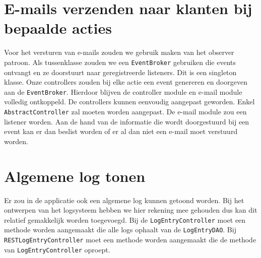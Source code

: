 \documentclass{article}
\begin{document}
\section{E-mails verzenden naar klanten bij bepaalde acties}

Voor het versturen van e-mails zouden we gebruik maken van het observer patroon. Als tussenklasse zouden we een \verb|EventBroker| gebruiken die events ontvangt en ze doorstuurt naar geregistreerde listeners. Dit is een singleton klasse. Onze controllers zouden bij elke actie een event genereren en doorgeven aan de \verb|EventBroker|. Hierdoor blijven de controller module en e-mail module volledig ontkoppeld. De controllers kunnen eenvoudig aangepast geworden. Enkel \verb|AbstractController| zal moeten worden aangepast. De e-mail module zou een listener worden. Aan de hand van de informatie die wordt doorgestuurd bij een event kan er dan beslist worden of er al dan niet een e-mail moet verstuurd worden.

\section{Algemene log tonen}

Er zou in de applicatie ook een algemene log kunnen getoond worden. Bij het ontwerpen van het logsysteem hebben we hier rekening mee gehouden dus kan dit relatief gemakkelijk worden toegevoegd. Bij de \verb|LogEntryController| moet een methode worden aangemaakt die alle logs ophaalt van de \verb|LogEntryDAO|. Bij \verb|RESTLogEntryController| moet een methode worden aangemaakt die de methode van \verb|LogEntryController| oproept.
\end{document}
